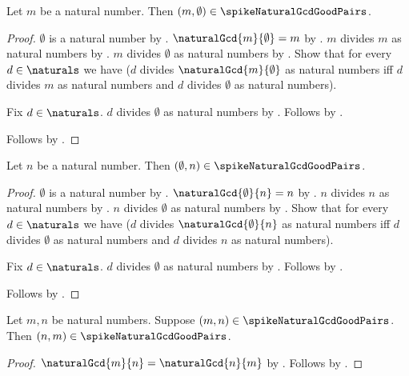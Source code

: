 \begin{proposition}\label{spike15_gcd_good_pair_zero_right}
    Let $m$ be a natural number.
    Then $(m,\emptyset)\in\spikeNaturalGcdGoodPairs$.
\end{proposition}
\begin{proof}
    $\emptyset$ is a natural number by .
    $\naturalGcd{m}{\emptyset}=m$
        by .
    $m$ divides $m$ as natural numbers
        by .
    $m$ divides $\emptyset$ as natural numbers
        by .
    Show that for every $d\in\naturals$ we have
        ($d$ divides $\naturalGcd{m}{\emptyset}$ as natural numbers iff
         $d$ divides $m$ as natural numbers and
         $d$ divides $\emptyset$ as natural numbers).
    \begin{subproof}
        Fix $d\in\naturals$.
        $d$ divides $\emptyset$ as natural numbers
            by .
        Follows by \auto.
    \end{subproof}
    Follows by .
\end{proof}

\begin{corollary}\label{spike15_gcd_good_pair_zero_left}
    Let $n$ be a natural number.
    Then $(\emptyset,n)\in\spikeNaturalGcdGoodPairs$.
\end{corollary}
\begin{proof}
    $\emptyset$ is a natural number by .
    $\naturalGcd{\emptyset}{n}=n$
        by .
    $n$ divides $n$ as natural numbers
        by .
    $n$ divides $\emptyset$ as natural numbers
        by .
    Show that for every $d\in\naturals$ we have
        ($d$ divides $\naturalGcd{\emptyset}{n}$ as natural numbers iff
         $d$ divides $\emptyset$ as natural numbers and
         $d$ divides $n$ as natural numbers).
    \begin{subproof}
        Fix $d\in\naturals$.
        $d$ divides $\emptyset$ as natural numbers
            by .
        Follows by \auto.
    \end{subproof}
    Follows by .
\end{proof}

\begin{proposition}\label{spike15_gcd_good_pair_symmetric}
    Let $m,n$ be natural numbers.
    Suppose $(m,n)\in\spikeNaturalGcdGoodPairs$.
    Then $(n,m)\in\spikeNaturalGcdGoodPairs$.
\end{proposition}
\begin{proof}
    $\naturalGcd{m}{n}=\naturalGcd{n}{m}$
        by .
    Follows by .
\end{proof}

